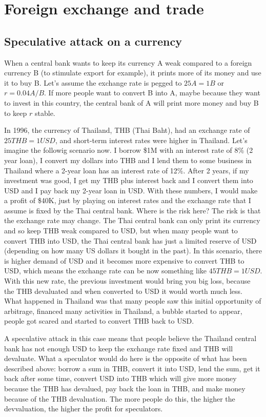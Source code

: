 \section{Foreign exchange and trade}
\subsection{Speculative attack on a currency}

When a central bank wants to keep its currency A weak compared to a foreign currency B (to stimulate export for example), it prints more of its money and use it to buy B. Let's assume the exchange rate is pegged to $25A = 1B$ or $r = 0.04A/B$. If more people want to convert B into A, maybe because they want to invest in this country, the central bank of A will print more money and buy B to keep $r$ stable.

In 1996, the currency of Thailand, THB (Thai Baht), had an exchange rate of $25THB = 1USD$, and short-term interest rates were higher in Thailand. Let's imagine the followig scenario now. I borrow \$1M with an interest rate of 8\% (2 year loan), I convert my dollars into THB and I lend them to some business in Thailand where a 2-year loan has an interest rate of 12\%. After 2 years, if my investment was good, I get my THB plus interest back and I convert them into USD and I pay back my 2-year loan in USD. With these numbers, I would make a profit of \$40K, just by playing on interest rates and the exchange rate that I assume is fixed by the Thai central bank. 
Where is the risk here? The risk is that the exchange rate may change. The Thai central bank can only print its currency and so keep THB weak compared to USD, but when many people want to convert THB into USD, the Thai central bank has just a limited reserve of USD (depending on how many US dollars it bought in the past). In this scenario, there is higher demand of USD and it becomes more expensive to convert THB to USD, which means the exchange rate can be now something like $45THB = 1USD$. With this new rate, the previous investment would bring you big loss, because the THB devaluated and when converted to USD it would worth much less. What happened in Thailand was that many people saw this initial opportunity of arbitrage, financed many activities in Thailand, a bubble started to appear, people got scared and started to convert THB back to USD. 

A speculative attack in this case means that people believe the Thailand central bank has not enough USD to keep the exchange rate fixed and THB will devaluate. What a speculator would do here is the opposite of what has been described above: borrow a sum in THB, convert it into USD, lend the sum, get it back after some time, convert USD into THB which will give more money because the THB has devalued, pay back the loan in THB, and make money because of the THB devaluation. The more people do this, the higher the devvaluation, the higher the profit for speculators.